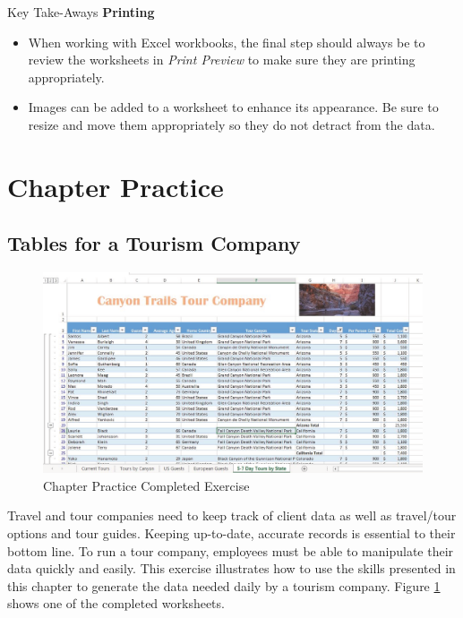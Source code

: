 \begin{center}
	\begin{tkwbox}{Key Take-Aways}
		\textbf{Printing}
		\\
		\begin{itemize}
			\setlength{\itemsep}{0pt}
			\setlength{\parskip}{0pt}
			\setlength{\parsep}{0pt}

			\item When working with Excel workbooks, the final step should always be to review the worksheets in \textit{Print Preview} to make sure they are printing appropriately.
			\item Images can be added to a worksheet to enhance its appearance. Be sure to resize and move them appropriately so they do not detract from the data.

		\end{itemize}
	\end{tkwbox}
\end{center}

\section{Chapter Practice}

\subsection{Tables for a Tourism Company}

\begin{figure}[H]
	\centering
	\includegraphics[width=\maxwidth{.95\linewidth}]{gfx/ch05_fig30}
	\caption{Chapter Practice Completed Exercise}
	\label{05:fig30}
\end{figure}

Travel and tour companies need to keep track of client data as well as travel/tour options and tour guides. Keeping up-to-date, accurate records is essential to their bottom line. To run a tour company, employees must be able to manipulate their data quickly and easily. This exercise illustrates how to use the skills presented in this chapter to generate the data needed daily by a tourism company. Figure \ref{05:fig30} shows one of the completed worksheets.

